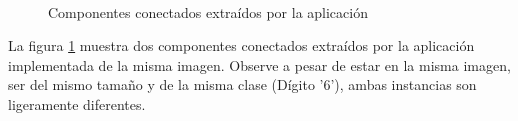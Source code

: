 \documentclass[a4paper, 11pt, oneside]{report}
\begin{document}
\begin{figure}
\centering
{}
\hspace{1cm}
\\ 
\caption{Componentes conectados extraídos por la aplicación}
\label{fig:concomp}
\end{figure}
La figura \ref{fig:concomp} muestra dos componentes conectados extraídos por la aplicación implementada de la misma imagen. Observe a pesar de estar en la misma imagen, ser del mismo tamaño y de la misma clase (Dígito '6'), ambas instancias son ligeramente diferentes.
\end{document}
